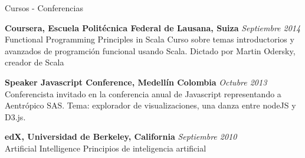 \documentclass[spanish]{resume} %
\begin{document}
\begin{rSection}{Cursos - Conferencias}

{\bf Coursera, Escuela Polit\'ecnica Federal de Lausana, Suiza} \hfill {\em Septiembre 2014} \\ 
Functional Programming Principles in Scala
Curso sobre temas introductorios y avanzados de programción funcional usando Scala.
Dictado por Martin Odersky, creador de Scala

{\bf Speaker Javascript Conference, Medellín Colombia} \hfill {\em Octubre 2013} \\ 
Conferencista invitado en la conferencia anual de Javascript representando a Aentr\'opico SAS.
Tema: explorador de visualizaciones, una danza entre nodeJS y D3.js.

{\bf edX, Universidad de Berkeley, California} \hfill {\em Septiembre 2010} \\ 
Artificial Intelligence
Principios de inteligencia artificial

\end{rSection}
\end{document}
